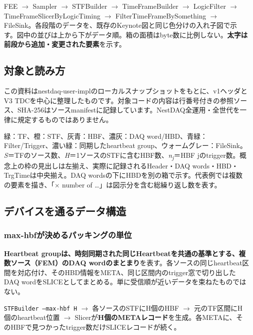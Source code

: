 FEE $\rightarrow$ Sampler $\rightarrow$ STFBuilder $\rightarrow$ TimeFrameBuilder $\rightarrow$ LogicFilter $\rightarrow$ TimeFrameSlicerByLogicTiming $\rightarrow$ FilterTimeFrameBySomething $\rightarrow$ FileSink。各段階のデータを、既存のKeynote図と同じ色分けの入れ子図で示す。図中の並びは上から下がデータ順。箱の面積はbyte数に比例しない。\textbf{太字は前段から追加・変更された要素}を示す。


\FloatBarrier
\subsection{対象と読み方}
この資料はnestdaq-user-implのローカルスナップショットをもとに、v1ヘッダとV3 TDCを中心に整理したものです。対象コードの内容は行番号付きの参照ソース、SHA-256はソースmanifestに記録しています。NestDAQ全運用・全世代を一律に規定するものではありません。

緑：TF、橙：STF、灰青：HBF、濃灰：DAQ word/HBD、青緑：Filter/Trigger、濃い緑：同期したheartbeat group、ウォームグレー：FileSink。\textit{S}＝TFのソース数、\textit{H}＝1ソースのSTFに含むHBF数、\textit{n\textsubscript{j}}＝HBF jのtrigger数。概念上の枠の見出しは左揃え、実際に記録されるHeader・DAQ words・HBD・TrgTimeは中央揃え。DAQ wordsの下にHBDを別の箱で示す。代表例では複数の要素を描き、「$\times$ number of …」は図示分を含む総繰り返し数を表す。


\FloatBarrier
\subsection{デバイスを通るデータ構造}
\label{sec:format-html-pipeline}

\subsubsection{max-hbfが決めるパッキングの単位}
\textbf{Heartbeat groupは、時刻同期された同じHeartbeatを共通の基準とする、複数ソース（FEM）のDAQ wordのまとまり}を表す。各ソースの同じheartbeat区間を対応付け、そのHBD情報をMETA、同じ区間内のtrigger窓で切り出したDAQ wordをSLICEとしてまとめる。単に受信順が近いデータを束ねたものではない。

\texttt{STFBuilder --max-hbf H} $\rightarrow$ 各ソースのSTFにH個のHBF $\rightarrow$ 元のTF区間にH個のheartbeat位置 $\rightarrow$ Slicerが\textbf{H個のMETAレコード}を生成。各METAに、そのHBFで見つかったtrigger数だけSLICEレコードが続く。


